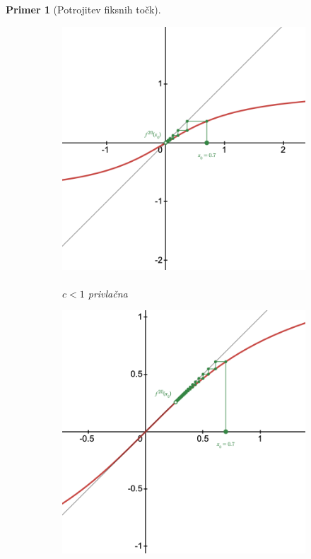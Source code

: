 \documentclass{article}
\newtheorem{primer}{Primer}
\begin{document}
\begin{primer}[Potrojitev fiksnih točk]
\begin{figure}[h]
    \centering
    \begin{subfigure}[c]{0.28\textwidth}
        \centering
        \includegraphics[width=\textwidth]{Grafi/cobweb171.png}
        \caption{\\$c<1$ privlačna}
        \label{fig:cobweb31}
    \end{subfigure}
    \begin{subfigure}[c]{0.28\textwidth}
        \centering
        \includegraphics[width=\textwidth]{Grafi/cobweb172.png}

\end{subfigure}
\end{figure}
\end{primer}
\end{document}
